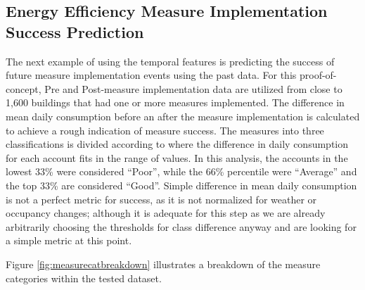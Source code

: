 \subsection{Energy Efficiency Measure Implementation Success Prediction}
\label{sec:measuresuccess}

The next example of using the temporal features is predicting the success of future measure implementation events using the past data. For this proof-of-concept, Pre and Post-measure implementation data are utilized from close to 1,600 buildings that had one or more measures implemented. The difference in mean daily consumption before an after the measure implementation is calculated to achieve a rough indication of measure success. The measures into three classifications is divided according to where the difference in daily consumption for each account fits in the range of values. In this analysis, the accounts in the lowest 33\% were considered “Poor”, while the 66\% percentile were “Average” and the top 33\% are considered “Good”. Simple difference in mean daily consumption is not a perfect metric for success, as it is not normalized for weather or occupancy changes; although it is adequate for this step as we are already arbitrarily choosing the thresholds for class difference anyway and are looking for a simple metric at this point. 


Figure \ref{fig:measurecatbreakdown} illustrates a breakdown of the measure categories within the tested dataset. 
